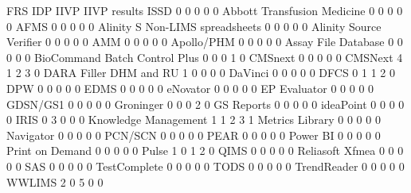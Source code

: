 \documentclass{article}
\begin{document}
\begin{Schunk}
\begin{Soutput}
                                  FRS IDP IIVP IIVP results ISSD
                                    0   0    0            0    0
  Abbott Transfusion Medicine       0   0    0            0    0
  AFMS                              0   0    0            0    0
  Alinity S Non-LIMS spreadsheets   0   0    0            0    0
  Alinity Source Verifier           0   0    0            0    0
  AMM                               0   0    0            0    0
  Apollo/PHM                        0   0    0            0    0
  Assay File Database               0   0    0            0    0
  BioCommand Batch Control Plus     0   0    0            1    0
  CMSnext                           0   0    0            0    0
  CMSNext                           4   1    2            3    0
  DARA Filler DHM and RU            1   0    0            0    0
  DaVinci                           0   0    0            0    0
  DFCS                              0   1    1            2    0
  DPW                               0   0    0            0    0
  EDMS                              0   0    0            0    0
  eNovator                          0   0    0            0    0
  EP Evaluator                      0   0    0            0    0
  GDSN/GS1                          0   0    0            0    0
  Groninger                         0   0    0            2    0
  GS Reports                        0   0    0            0    0
  ideaPoint                         0   0    0            0    0
  IRIS                              0   3    0            0    0
  Knowledge Management              1   1    2            3    1
  Metrics Library                   0   0    0            0    0
  Navigator                         0   0    0            0    0
  PCN/SCN                           0   0    0            0    0
  PEAR                              0   0    0            0    0
  Power BI                          0   0    0            0    0
  Print on Demand                   0   0    0            0    0
  Pulse                             1   0    1            2    0
  QIMS                              0   0    0            0    0
  Reliasoft Xfmea                   0   0    0            0    0
  SAS                               0   0    0            0    0
  TestComplete                      0   0    0            0    0
  TODS                              0   0    0            0    0
  TrendReader                       0   0    0            0    0
  WWLIMS                            2   0    5            0    0
                                 

\end{Soutput}
\end{Schunk}
\end{document}
